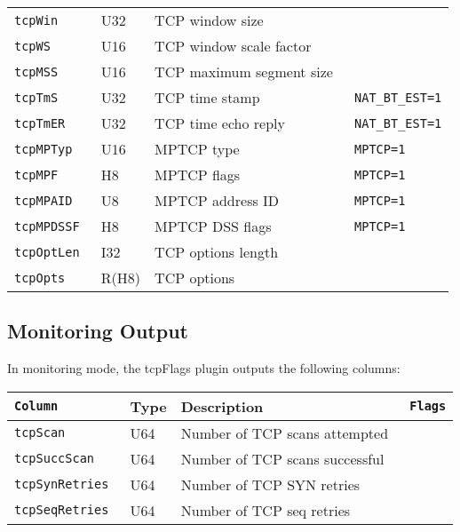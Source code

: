\documentclass[documentation]{subfiles}
\begin{document}
\begin{longtable}{>{\tt}lll>{\tt\small}l}
    tcpWin                           & U32     & TCP window size                              & \\
    tcpWS                            & U16     & TCP window scale factor                      & \\
    tcpMSS                           & U16     & TCP maximum segment size                     & \\
    tcpTmS                           & U32     & TCP time stamp                               & NAT\_BT\_EST=1\\
    tcpTmER                          & U32     & TCP time echo reply                          & NAT\_BT\_EST=1\\
    tcpMPTyp                         & U16     & MPTCP type                                   & MPTCP=1\\
    tcpMPF                           & H8      & MPTCP flags                                  & MPTCP=1\\
    tcpMPAID                         & U8      & MPTCP address ID                             & MPTCP=1\\
    tcpMPDSSF                        & H8      & MPTCP DSS flags                              & MPTCP=1\\
    tcpOptLen                        & I32     & TCP options length                           & \\
    tcpOpts                          & R(H8)   & TCP options                                  & \\
    \bottomrule
\end{longtable}

\subsection{Monitoring Output}
In monitoring mode, the tcpFlags plugin outputs the following columns:
\begin{longtable}{>{\tt}lll>{\tt\small}l}
    \toprule
    {\bf Column} & {\bf Type} & {\bf Description} & {\bf Flags}\\
    \midrule\endhead%
    tcpScan       & U64 & Number of TCP scans attempted  & \\
    tcpSuccScan   & U64 & Number of TCP scans successful & \\
    tcpSynRetries & U64 & Number of TCP SYN retries      & \\
    tcpSeqRetries & U64 & Number of TCP seq retries      & \\
    \bottomrule
\end{longtable}
\end{document}
